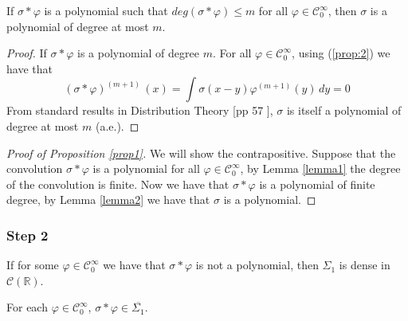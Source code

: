 \documentclass[../main.tex]{subfiles}
\begin{document}
	\begin{lema}  \label{lemma2}
		If $\sigma \ast \varphi$ is a polynomial such that $ deg (\sigma \ast \varphi) \leq m$ for all $\varphi \in \mathcal{C}^\infty_0$, then $\sigma$ is a polynomial of degree at most $m$. 
	\end{lema}
	\begin{proof} 
	If $\sigma \ast \varphi$ is a polynomial of degree $m$.
	For all $\varphi \in \mathcal{C}^\infty_0$, using (\ref{prop:2}) we have that
	$$(\sigma \ast \varphi)^{(m+1)} \, (x)=\int \sigma(x-y)\varphi^{(m+1)}(y) \, dy= 0$$  
	From standard results in Distribution Theory [pp 57 \cite{friedman1963generalized}], $\sigma $ is itself a polynomial of degree at most $m$ (a.e.).
	\end{proof} 
\vspace{\baselineskip} 

\begin{proof}[Proof of Proposition \ref{prop1}]
We will show the contrapositive. Suppose that the convolution $\sigma \ast \varphi$ is a polynomial for all $\varphi \in \mathcal{C}^\infty_0$, by Lemma \ref{lemma1} the degree of the convolution is finite. Now we have that $\sigma \ast \varphi$ is a polynomial of finite degree, by Lemma \ref{lemma2} we have that $\sigma$ is a polynomial. 
\end{proof}
\vspace{\baselineskip} 
\subsubsection{Step 2}

	\begin{propo}  \label{prop2}
	If for some $\varphi \in \mathcal{C}^\infty_0 $ we have that $\sigma \ast \varphi $ is not a polynomial, then $\Sigma_1$ is dense in $\mathcal{C}(\mathbb{R})$.
\end{propo}

	\begin{lema}  \label{lemma3}
		For each $\varphi \in  \mathcal{C}^\infty_0$, $ \sigma \ast \varphi \in  \overline{\Sigma_1}$. 
		
	\end{lema}
	
\end{document}
